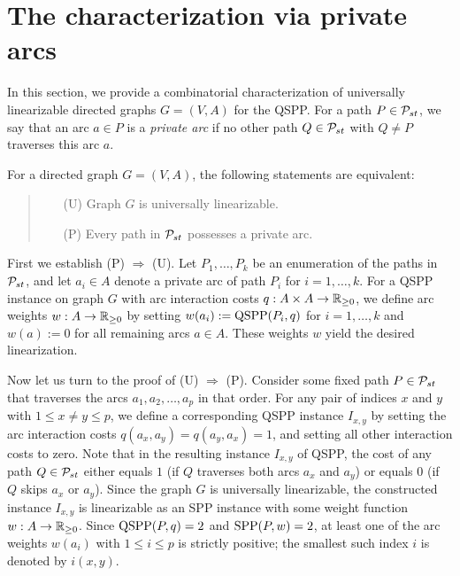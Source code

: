 \section{The characterization via private arcs}
\label{sec:private}
In this section, we provide a combinatorial characterization of universally linearizable 
directed graphs $G=(V,A)$ for the QSPP.
For a path $P\in{\cal P}_{st}$, we say that an arc $a\in P$ is a \emph{private arc} if no other 
path $Q\in{\cal P}_{st}$ with $Q\ne P$ traverses this arc $a$.
\begin{theorem}
\label{th:private}
For a directed graph $G=(V,A)$, the following statements are equivalent:
\begin{quote}
\begin{itemize}
\item[(U)] Graph $G$ is universally linearizable.
\item[(P)] Every path in ${\cal P}_{st}$ possesses a private arc.
\end{itemize}
\end{quote}
\end{theorem}
\proof
First we establish (P) $\Rightarrow$ (U).
Let $P_1,\ldots,P_k$ be an enumeration of the paths in ${\cal P}_{st}$, and
let $a_i\in A$ denote a private arc of path $P_i$ for $i=1,\ldots,k$.
For a QSPP instance on graph $G$ with arc interaction costs $q:A\times A\to{\mathbb{R}_{\ge0}}$, we define 
arc weights $w:A\to{\mathbb{R}_{\ge0}}$ by setting $w(a_i):=\text{QSPP}(P_i,q)$ for $i=1,\ldots,k$ and 
$w(a):=0$ for all remaining arcs $a\in A$.
These weights $w$ yield the desired linearization.

Now let us turn to the proof of (U) $\Rightarrow$ (P).
Consider some fixed path $P\in{\cal P}_{st}$ that traverses the arcs $a_1,a_2,\ldots,a_p$ in that order.
For any pair of indices $x$ and $y$ with $1\le x\ne y\le p$, we define a corresponding QSPP instance
$I_{x,y}$ by setting the arc interaction costs $q(a_x,a_y)=q(a_y,a_x)=1$, and setting all other 
interaction costs to zero.
Note that in the resulting instance $I_{x,y}$ of QSPP, the cost of any path $Q\in{\cal P}_{st}$ 
either equals $1$ (if $Q$ traverses both arcs $a_x$ and $a_y$) or equals $0$ (if $Q$ skips 
$a_x$ or $a_y$).
Since the graph $G$ is universally linearizable, the constructed instance $I_{x,y}$ is linearizable
as an SPP instance with some weight function $w:A\to{\mathbb{R}_{\ge0}}$.
Since $\text{QSPP}(P,q)=2$ and $\text{SPP}(P,w)=2$, at least one of the arc weights $w(a_i)$ with 
$1\le i\le p$ is strictly positive; the smallest such index $i$ is denoted by $i(x,y)$.

